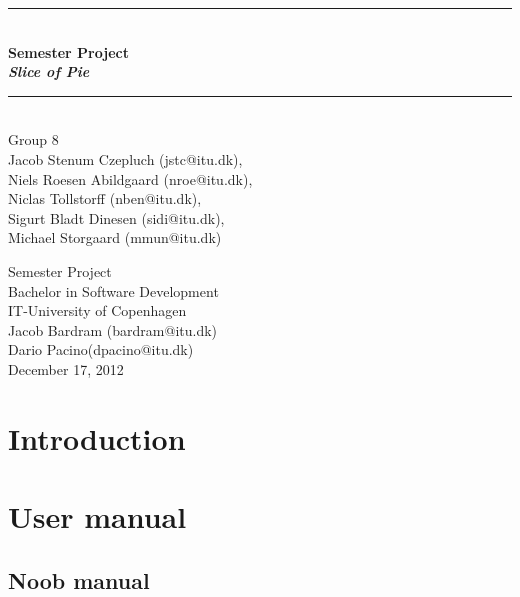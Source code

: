 \documentclass[a4paper,11pt]{article}
\begin{document}
\begin{titlepage}
\centering \parindent=0pt
\newcommand{\HRule}{\rule{\textwidth}{1mm}}
 \HRule\\[1cm]\Huge\bfseries
Semester Project\\\emph{Slice of Pie}\\[0.7cm]
\HRule\\[4cm]  \large Group 8
\\Jacob Stenum Czepluch (jstc@itu.dk), \\Niels Roesen Abildgaard (nroe@itu.dk), \\Niclas Tollstorff (nben@itu.dk), \\Sigurt Bladt Dinesen (sidi@itu.dk), \\Michael Storgaard (mmun@itu.dk)\\
 \normalsize %
\begin{flushleft}
Semester Project\\
Bachelor in Software Development\\
IT-University of Copenhagen\\
Jacob Bardram (bardram@itu.dk)\\
Dario Pacino(dpacino@itu.dk) \\
December 17, 2012 \end{flushleft}
\end{titlepage}

\tableofcontents
\pagebreak

\pagebreak
\section{Introduction}


\pagebreak
\section{User manual}


\subsection{Noob manual}
\label{sec:User manual}

\end{document}
